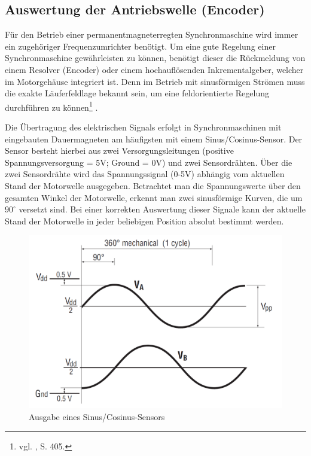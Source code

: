	
\newpage

\subsection{Auswertung der Antriebswelle (Encoder)}
Für den Betrieb einer permanentmagneterregten Synchronmaschine wird immer ein zugehöriger Frequenzumrichter benötigt. Um eine gute Regelung einer Synchronmaschine gewährleisten zu können, benötigt dieser die Rückmeldung von einem Resolver (Encoder) oder einem hochauflösenden Inkrementalgeber, welcher im Motorgehäuse integriert ist. Denn im Betrieb mit sinusförmigen Strömen muss die exakte Läuferfeldlage bekannt sein, um eine feldorientierte Regelung durchführen zu können\footnote{vgl. \cite{Fischer}, S. 405.} .

Die Übertragung des elektrischen Signals erfolgt in Synchronmaschinen mit eingebauten Dauermagneten am häufigsten mit einem Sinus/Cosinus-Sensor. Der Sensor besteht hierbei aus zwei Versorgungsleitungen (positive Spannungsversorgung = 5V; Ground = 0V) und zwei Sensordrähten. Über die zwei Sensordrähte wird das Spannungssignal (0-5V) abhängig vom aktuellen Stand der Motorwelle ausgegeben. Betrachtet man die Spannungswerte über den gesamten Winkel der Motorwelle, erkennt man zwei sinusförmige Kurven, die um $90^\circ$ versetzt sind. Bei einer korrekten Auswertung dieser Signale kann der aktuelle Stand der Motorwelle in jeder beliebigen Position absolut bestimmt werden.
\\[8mm]
\begin{figure}[H]
	\begin{center}
		\includegraphics[scale=0.3]{figures/antrieb/SinCos_Sensor.png}
		\caption{Ausgabe eines Sinus/Cosinus-Sensors \cite{Manual}}
	\end{center}
\end{figure}



